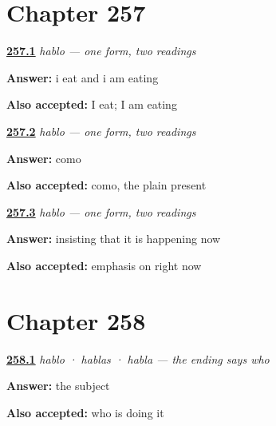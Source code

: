 \section*{Chapter 257}

\noindent\begin{minipage}[t]{\linewidth}
\raggedright
\hyperlink{review-ES-C66-hablo-dos-lecturas-both}{\textbf{257.1}} \emph{hablo — one form, two readings}\par
\small \textbf{Answer:} i eat and i am eating\par
\footnotesize \textbf{Also accepted:} I eat; I am eating
\end{minipage}\par\medskip

\noindent\begin{minipage}[t]{\linewidth}
\raggedright
\hyperlink{review-ES-C66-hablo-dos-lecturas-normal}{\textbf{257.2}} \emph{hablo — one form, two readings}\par
\small \textbf{Answer:} como\par
\footnotesize \textbf{Also accepted:} como, the plain present
\end{minipage}\par\medskip

\noindent\begin{minipage}[t]{\linewidth}
\raggedright
\hyperlink{review-ES-C66-hablo-dos-lecturas-when}{\textbf{257.3}} \emph{hablo — one form, two readings}\par
\small \textbf{Answer:} insisting that it is happening now\par
\footnotesize \textbf{Also accepted:} emphasis on right now
\end{minipage}\par\medskip

\section*{Chapter 258}

\noindent\begin{minipage}[t]{\linewidth}
\raggedright
\hyperlink{review-ES-C66-la-terminacion-dice-quien-rule}{\textbf{258.1}} \emph{hablo · hablas · habla — the ending says who}\par
\small \textbf{Answer:} the subject\par
\footnotesize \textbf{Also accepted:} who is doing it
\end{minipage}\par\medskip

